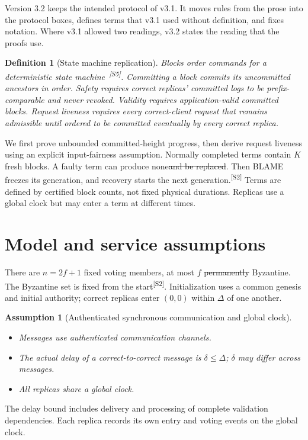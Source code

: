\documentclass[11pt,a4paper]{article}
\newcommand{\NEW}[1]{{\color{diffNew}#1}}
\newcommand{\DEL}[1]{{\color{diffDel}\sout{#1}}}
\newcommand{\CH}[1]{\textsuperscript{\color{diffNew}\sffamily\scriptsize[#1]}}
\newcommand{\NEW}[1]{#1}
\newcommand{\DEL}[1]{}
\newcommand{\CH}[1]{}
\newtheorem{definition}{Definition}[section]
\newtheorem{assumption}[assumption]{Assumption}
\newcounter{protocol}
\begin{document}
\NEW{Version 3.2 keeps the intended protocol of v3.1. It moves rules from
the prose into the protocol boxes, defines terms that v3.1 used without
definition, and fixes notation. Where v3.1 allowed two readings, v3.2
states the reading that the proofs use.}

\begin{definition}[State machine replication]
Blocks order commands for a deterministic state
machine\NEW{~\cite{schneider}}\CH{S5}. Committing a
block commits its uncommitted ancestors in order. \emph{Safety} requires
correct replicas' committed logs to be prefix-comparable and never revoked.
\emph{Validity} requires application-valid committed blocks.
\emph{Request liveness} requires every correct-client request that remains
admissible until ordered to be committed eventually by every correct replica.
\end{definition}
We first prove unbounded committed-height progress, then derive request
liveness using an explicit input-fairness assumption. Normally completed
terms contain $K$ fresh blocks. A faulty term can produce none\DEL{and be
replaced}. \NEW{Then BLAME freezes its generation, and recovery starts the
next generation.}\CH{S2} Terms are defined by certified block counts, not
fixed physical durations. Replicas use a global clock but may enter a term
at different times.

\section{Model and service assumptions}
\label{sec:model}
There are $n=2f+1$ fixed voting members, at most $f$ \DEL{permanently}
Byzantine\NEW{. The Byzantine set is fixed from the start}\CH{S2}.
Initialization uses a common genesis and initial authority; correct
replicas enter $(0,0)$ within $\Delta$ of one another.

\begin{assumption}[Authenticated synchronous communication and global clock]
\label{ass:network}
\leavevmode\par
\begin{itemize}
    \item Messages use authenticated communication channels.
    \item The actual delay of a correct-to-correct message is $\delta\le\Delta$;
    $\delta$ may differ across messages.
    \item All replicas share a global clock.
\end{itemize}
\end{assumption}
The delay bound includes delivery and processing of complete validation
dependencies. Each replica records its own entry and voting events on
the global clock.
\end{document}
